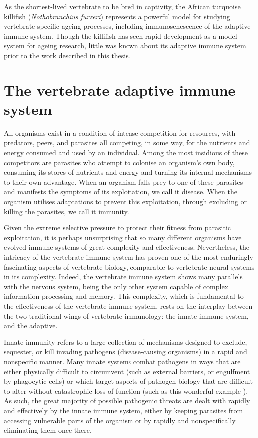 As the shortest-lived vertebrate to be bred in captivity, the African turquoise killifish (\textit{Nothobranchius furzeri}) represents a powerful model for studying vertebrate-specific ageing processes, including immunosenescence of the adaptive immune system. Though the killifish has seen rapid development as a model system for ageing research, little was known about its adaptive immune system prior to the work described in this thesis. %

\pagebreak

\section{The vertebrate adaptive immune system}

All organisms exist in a condition of intense competition for resources, with predators, peers, and parasites all competing, in some way, for the nutrients and energy consumed and used by an individual. Among the most insidious of these competitors are parasites who attempt to colonise an organism's own body, consuming its stores of nutrients and energy and turning its internal mechanisms to their own advantage. When an organism falls prey to one of these parasites and manifests the symptoms of its exploitation, we call it disease. When the organism utilises adaptations to prevent this exploitation, through excluding or killing the parasites, we call it immunity.

Given the extreme selective pressure to protect their fitness from parasitic exploitation, it is perhaps unsurprising that so many different organisms have evolved immune systems of great complexity and effectiveness. Nevertheless, the intricacy of the vertebrate immune system has proven one of the most enduringly fascinating aspects of vertebrate biology, comparable to vertebrate neural systems in its complexity. Indeed, the vertebrate immune system shows many parallels with the nervous system, being the only other system capable of complex information processing and memory. This complexity, which is fundamental to the effectiveness of the vertebrate immune system, rests on the interplay between the two traditional wings of vertebrate immunology: the innate immune system, and the adaptive.

Innate immunity refers to a large collection of mechanisms designed to exclude, sequester, or kill invading pathogens (disease-causing organisms) in a rapid and nonspecific manner. Many innate systems combat pathogens in ways that are either physically difficult to circumvent (such as external barriers, or engulfment by phagocytic cells) or which target aspects of pathogen biology that are difficult to alter without catastrophic loss of function (such as this wonderful example %
). As such, the great majority of possible pathogenic threats are dealt with rapidly and effectively by the innate immune system, either by keeping parasites from accessing vulnerable parts of the organism or by rapidly and nonspecifically eliminating them once there.

